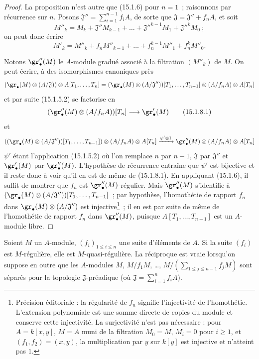 \begin{proof}
La proposition n'est autre que (15.1.6) pour $n=1$~; raisonnons par récurrence
sur $n$. Posons
$\mathfrak{J}''=\sum_{i=1}^{n-1}f_iA$,
de sorte que $\mathfrak{J}=\mathfrak{J}''+f_nA$, et soit
\[
  M''_k=M_k+\mathfrak{J}''M_{k-1}+\ldots+
  \mathfrak{J}''^{k-1}M_1+\mathfrak{J}''^kM_0~;
\]
on peut donc écrire
\[
  M'_k=M''_k+f_nM''_{k-1}+\ldots+f_n^{k-1}M''_1+f_n^kM''_0.
\]

Notons $\gr''_\bullet(M)$ le $A$-module gradué associé à la filtration
$(M''_k)$ de $M$. On peut écrire, à des isomorphismes canoniques près
\[
  (\gr_\bullet(M)\otimes(A/\mathfrak{J}))\otimes A[T_1,\ldots,T_n]
  =
  (\gr_\bullet(M)\otimes(A/\mathfrak{J}''))[T_1,\ldots,T_{n-1}]
  \otimes(A/f_nA)\otimes A[T_n]
\]
et par suite (15.1.5.2) se factorise en
\[
  (\gr''_\bullet(M)\otimes(A/f_nA))[T_n]\longrightarrow\gr'_\bullet(M)
  \tag{15.1.8.1}\label{0.15.1.8.1-fr}
\]
et
\[
  ((\gr_\bullet(M)\otimes(A/\mathfrak{J}''))[T_1,\ldots,T_{n-1}])
  \otimes(A/f_nA)\otimes A[T_n]
  \xrightarrow{\psi'\otimes1}
  \gr''_\bullet(M)\otimes(A/f_nA)\otimes A[T_n]
\]
$\psi'$ étant l'application (15.1.5.2) où l'on remplace $n$ par $n-1$,
$\mathfrak{J}$ par $\mathfrak{J}''$ et $\gr'_\bullet(M)$ par
$\gr''_\bullet(M)$. L'hypothèse de récurrence entraîne que $\psi'$ est
bijective et il reste donc à voir qu'il en est de même de (15.1.8.1). En
appliquant (15.1.6), il suffit de montrer que $f_n$ est
$\gr''_\bullet(M)$-régulier. Mais $\gr''_\bullet(M)$ s'identifie à
$(\gr_\bullet(M)\otimes(A/\mathfrak{J}''))[T_1,\ldots,T_{n-1}]$~;
par hypothèse, l'homothétie de rapport $f_n$ dans
$\gr_\bullet(M)\otimes(A/\mathfrak{J}'')$ est injective\footnote{Précision éditoriale : la régularité de $f_n$ signifie l'injectivité de l'homothétie. L'extension polynomiale est une somme directe de copies du module et conserve cette injectivité. La surjectivité n'est pas nécessaire : pour $A=k[x,y]$, $M=A$ muni de la filtration $M_0=M$, $M_i=0$ pour $i\geq1$, et $(f_1,f_2)=(x,y)$, la multiplication par $y$ sur $k[y]$ est injective et n'atteint pas $1$.}~; il en est par suite
de même de l'homothétie de rapport $f_n$ dans $\gr''_\bullet(M)$, puisque
$A[T_1,\ldots,T_{n-1}]$ est un $A$-module libre.
\end{proof}

\begin{proposition}[15.1.9]
\label{0.15.1.9-fr}
Soient $M$ un $A$-module, $(f_i)_{1\leq i\leq n}$ une suite d'éléments de $A$.
Si la suite $(f_i)$ est $M$-régulière, elle est $M$-quasi-régulière. La
réciproque est vraie lorsqu'on suppose en outre que les $A$-modules
$M$, $M/f_1M$, \ldots, $M/\left(\sum_{1\leq j\leq n-1}f_jM\right)$
sont séparés pour la topologie $\mathfrak{J}$-préadique (où
$\mathfrak{J}=\sum_{i=1}^n f_iA$).
\end{proposition}

